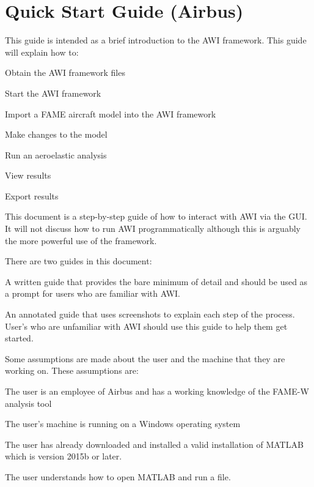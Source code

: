\section*{Quick Start Guide (Airbus)}

This guide is intended as a brief introduction to the AWI framework. This guide will explain how to:

\begin{itemize}
{\indentitem \item{Obtain the AWI framework files}}
{\indentitem\item{Start the AWI framework}}
{\indentitem\item{Import a FAME aircraft model into the AWI framework}}
{\indentitem\item{Make changes to the model}}
{\indentitem\item{Run an aeroelastic analysis}}
{\indentitem\item{View results}}
{\indentitem\item{Export results}}
\end{itemize}

This document is a step-by-step guide of how to interact with AWI via the GUI. It will not discuss how to run AWI programmatically although this is arguably the more powerful use of the framework. 

There are two guides in this document:
\begin{enumerate}
{\indentitem\item A written guide that provides the bare minimum of detail and should be used as a prompt for users who are familiar with AWI.}
{\indentitem\item An annotated guide that uses screenshots to explain each step of the process. User’s who are unfamiliar with AWI should use this guide to help them get started.}
\end{enumerate}

Some assumptions are made about the user and the machine that they are working on. These assumptions are:

\begin{itemize}
{\indentitem\item The user is an employee of Airbus and has a working knowledge of the FAME-W analysis tool}
{\indentitem\item The user’s machine is running on a Windows operating system}
{\indentitem\item The user has already downloaded and installed a valid installation of MATLAB which is version 2015b or later.}
{\indentitem\item The user understands how to open MATLAB and run a file.}
\end{itemize}

